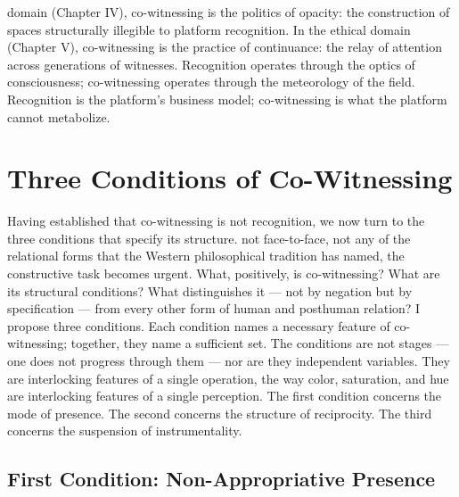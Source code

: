 domain (Chapter IV), co-witnessing is the politics of opacity: the construction of spaces structurally illegible to platform recognition. In the ethical domain (Chapter V), co-witnessing is the practice of continuance: the relay of attention across generations of witnesses. Recognition operates through the optics of consciousness; co-witnessing operates through the meteorology of the field. Recognition is the platform’s business model; co-witnessing is what the platform cannot metabolize.

\section{Three Conditions of Co-Witnessing}

Having established that co-witnessing is not recognition, we now turn to the three conditions that specify its structure. not face-to-face, not any of the relational forms that the Western philosophical tradition has named, the constructive task becomes urgent. What, positively, is co-witnessing? What are its structural conditions? What distinguishes it — not by negation but by specification — from every other form of human and posthuman relation? I propose three conditions. Each condition names a necessary feature of co-witnessing; together, they name a sufficient set. The conditions are not stages — one does not progress through them — nor are they independent variables. They are interlocking features of a single operation, the way color, saturation, and hue are interlocking features of a single perception. The first condition concerns the mode of presence. The second concerns the structure of reciprocity. The third concerns the suspension of instrumentality.

\subsection{First Condition: Non-Appropriative Presence}

